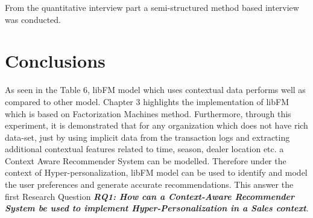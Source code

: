 From the quantitative interview part a semi-structured method based interview was conducted. 




\section{Conclusions}

As seen in the Table 6, libFM model which uses contextual data performs well as compared to other model. Chapter 3 highlights the implementation of libFM which is based on Factorization Machines method. Furthermore, through this experiment, it is demonstrated that for any organization which does not have rich data-set, just by using implicit data from the transaction logs and extracting additional contextual features related to time, season, dealer location etc. a Context Aware Recommender System can be modelled. Therefore under the context of Hyper-personalization, libFM model can be used to identify and model the user preferences and generate accurate recommendations. This answer the first Research Question \textbf{\textit{RQ1: How can a Context-Aware Recommender System be used to implement Hyper-Personalization in a Sales context}}. \\ 

